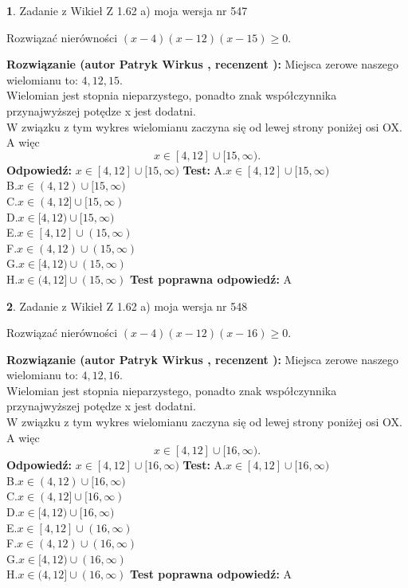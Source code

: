 \documentclass[12pt, a4paper]{article}
\theoremstyle{definition} %
\newtheorem{zad}{}
\newcommand{\zadStart}[1]{\begin{zad}#1\newline}
\newcommand{\zadStop}{\end{zad}}
\newcommand{\rozwStart}[2]{\noindent \textbf{Rozwiązanie (autor #1 , recenzent #2): }\newline}
\newcommand{\rozwStop}{\newline}
\newcommand{\odpStart}{\noindent \textbf{Odpowiedź:}\newline}
\newcommand{\odpStop}{\newline}
\newcommand{\testStart}{\noindent \textbf{Test:}\newline}
\newcommand{\testStop}{\newline}
\newcommand{\kluczStart}{\noindent \textbf{Test poprawna odpowiedź:}\newline}
\newcommand{\kluczStop}{\newline}
\begin{document}
\zadStart{Zadanie z Wikieł Z 1.62 a) moja wersja nr 547}

Rozwiązać nierówności $(x-4)(x-12)(x-15)\ge0$.
\zadStop
\rozwStart{Patryk Wirkus}{}
Miejsca zerowe naszego wielomianu to: $4, 12, 15$.\\
Wielomian jest stopnia nieparzystego, ponadto znak współczynnika przy\linebreak najwyższej potędze x jest dodatni.\\ W związku z tym wykres wielomianu zaczyna się od lewej strony poniżej osi OX. A więc $$x \in [4,12] \cup [15,\infty).$$
\rozwStop
\odpStart
$x \in [4,12] \cup [15,\infty)$
\odpStop
\testStart
A.$x \in [4,12] \cup [15,\infty)$\\
B.$x \in (4,12) \cup [15,\infty)$\\
C.$x \in (4,12] \cup [15,\infty)$\\
D.$x \in [4,12) \cup [15,\infty)$\\
E.$x \in [4,12] \cup (15,\infty)$\\
F.$x \in (4,12) \cup (15,\infty)$\\
G.$x \in [4,12) \cup (15,\infty)$\\
H.$x \in (4,12] \cup (15,\infty)$
\testStop
\kluczStart
A
\kluczStop



\zadStart{Zadanie z Wikieł Z 1.62 a) moja wersja nr 548}

Rozwiązać nierówności $(x-4)(x-12)(x-16)\ge0$.
\zadStop
\rozwStart{Patryk Wirkus}{}
Miejsca zerowe naszego wielomianu to: $4, 12, 16$.\\
Wielomian jest stopnia nieparzystego, ponadto znak współczynnika przy\linebreak najwyższej potędze x jest dodatni.\\ W związku z tym wykres wielomianu zaczyna się od lewej strony poniżej osi OX. A więc $$x \in [4,12] \cup [16,\infty).$$
\rozwStop
\odpStart
$x \in [4,12] \cup [16,\infty)$
\odpStop
\testStart
A.$x \in [4,12] \cup [16,\infty)$\\
B.$x \in (4,12) \cup [16,\infty)$\\
C.$x \in (4,12] \cup [16,\infty)$\\
D.$x \in [4,12) \cup [16,\infty)$\\
E.$x \in [4,12] \cup (16,\infty)$\\
F.$x \in (4,12) \cup (16,\infty)$\\
G.$x \in [4,12) \cup (16,\infty)$\\
H.$x \in (4,12] \cup (16,\infty)$
\testStop
\kluczStart
A
\kluczStop
\end{document}
